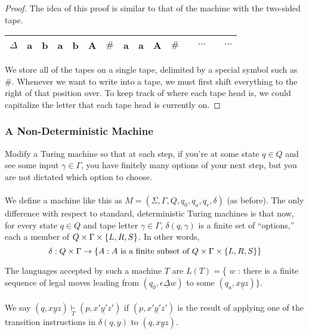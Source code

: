 \documentclass[]{article}
\DeclarePairedDelimiter{\set}{\lbrace}{\rbrace}
\theoremstyle{definition}
\begin{document}
        \begin{proof}
          The idea of this proof is similar to that of the machine with the two-sided tape.
          \begin{center}
          \begin{tabular}{|c|c|c|c|c|c|c|c|c|c|c|cccc}
            \hline
            $\Delta$ & a & b & a & b & A & $\#$ & a & a & A & $\#$ & & $\cdots$ & & $\cdots$ \\
            \hline
          \end{tabular}
        \end{center}

        We store all of the tapes on a single tape, delimited by a special symbol such as $\#$. Whenever we want to write into a tape, we must first shift everything to the right of that position over. To keep track of where each tape head is, we could capitalize the letter that each tape head is currently on.
        \end{proof}

      \subsubsection{A Non-Deterministic Machine}
        Modify a Turing machine so that at each step, if you're at some state $q \in Q$ and see some input $\gamma \in \Gamma$, you have finitely many options of your next step, but you are not dictated which option to choose.
        \\ \\
        We define a machine like this as $M = (\Sigma, \Gamma, Q, q_0, q_a, q_r, \delta)$ (as before). The only difference with respect to standard, deterministic Turing machines is that now, for every state $q \in Q$ and tape letter $\gamma \in \Gamma$, $\delta(q, \gamma)$ is a finite set of ``options,'' each a member of $Q \times \Gamma \times \set{L, R, S}$. In other words,
        $$
          \delta: Q \times \Gamma \to \set{A : A \text{ is a finite subset of } Q \times \Gamma \times \set{L, R, S}}
        $$

        The languages accepted by such a machine $T$ are $L(T) = $\{ $w$ : there is a finite sequence of legal moves leading from $(q_0, \epsilon \underline{\Delta} w)$ to some $(q_a, x \underline{y}z)\}$.
        \\ \\
        We say $(q, x \underline{y}z) \underset{T}{\vdash} (p, x'\underline{y'}z')$ if $(p, x'\underline{y'}z')$ is the result of applying one of the transition instructions in $\delta(q, y)$ to $(q, x\underline{y}z)$.
\end{document}
